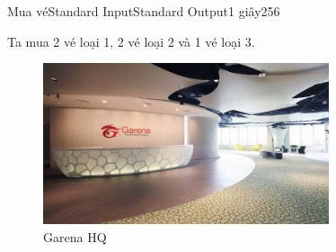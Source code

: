 \documentclass[11pt,a4paper,oneside]{article}
\begin{document}
\begin{problem}{Mua vé}{Standard Input}{Standard Output}{1 giây}{256}
\Example

\begin{example}
%
\end{example}

\vspace{.5cm}
Ta mua 2 vé loại 1, 2 vé loại 2 và 1 vé loại 3.

\begin{figure}[h]
\centering
\includegraphics[width=0.75\textwidth]{garena-office-in-fusionopolis}
\caption{Garena HQ}
\end{figure}

\end{problem}
\end{document}
